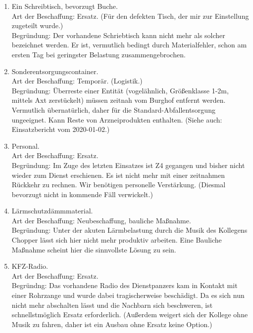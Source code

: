 \begin{enumerate}[leftmargin=*, itemsep=1ex]
  \item Ein Schreibtisch, bevorzugt Buche. \\
    Art der Beschaffung: Ersatz. (Für den defekten Tisch, der mir zur Einstellung zugeteilt wurde.) \\
    Begründung:
      Der vorhandene Schriebtisch kann nicht mehr als solcher bezeichnet werden.
      Er ist, vermutlich bedingt durch Materialfehler, schon am ersten Tag bei geringster Belastung zusammengebrochen.

  \item Sonderentsorgungscontainer. \\
    Art der Beschaffung: Temporär. (Logistik.) \\%
    Begründung:
      Überreste einer Entität (vogelähnlich, Größenklasse 1-2m, mittels Axt zerstückelt) müssen zeitnah vom Burghof entfernt werden.
      Vermutlich übernatürlich, daher für die Standard-Abfallentsorgung ungeeignet.
      Kann Reste von Arzneiprodukten enthalten.
      (Siehe auch: Einsatzbericht vom 2020-01-02.)

  \item Personal. \\
    Art der Beschaffung: Ersatz. \\
    Begründung:
      Im Zuge des letzten Einsatzes ist Z4 gegangen und bisher nicht wieder zum Dienst erschienen.
      Es ist nicht mehr mit einer zeitnahmen Rückkehr zu rechnen.
      Wir benötigen personelle Verstärkung.
      (Diesmal bevorzugt nicht in kommende Fäll verwickelt.)

  \item Lärmschutzdämmmaterial. \\
    Art der Beschaffung: Neubeschaffung, bauliche Maßnahme. \\
    Begründung:
      Unter der akuten Lärmbelastung durch die Musik des Kollegens Chopper lässt sich hier nicht mehr produktiv arbeiten.
      Eine Bauliche Maßnahme scheint hier die sinnvollste Lösung zu sein.

  \item KFZ-Radio. \\
    Art der Beschaffung: Ersatz. \\
    Begründng:
      Das vorhandene Radio des Dienstpanzers kam in Kontakt mit einer Rohrzange und wurde dabei tragischerweise beschädigt.
      Da es sich nun nicht mehr abschalten lässt und die Nachbarn sich beschweren, ist schnellstmöglich Ersatz erforderlich.
      (Außerdem weigert sich der Kollege ohne Musik zu fahren, daher ist ein Ausbau ohne Ersatz keine Option.)
\end{enumerate}

